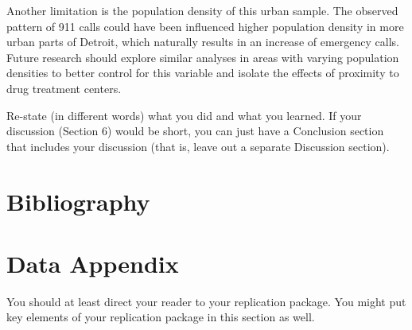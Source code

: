 \documentclass[12pt]{article}
\begin{document}
    Another limitation is the population density of this urban sample. The observed pattern of 911 calls could have been influenced higher population density in more urban parts of Detroit, which naturally results in an increase of emergency calls. Future research should explore similar analyses in areas with varying population densities to better control for this variable and isolate the effects of proximity to drug treatment centers. 

 
Re-state (in different words) what you did and what you learned. If your discussion (Section 6) would be short, you can just have a Conclusion section that includes your discussion (that is, leave out a separate Discussion section).

\newpage
\section*{Bibliography}
\singlespacing
\setlength\bibsep{0pt}





\newpage
\section*{Data Appendix} \label{sec:appendixa}

You should at least direct your reader to your replication package. You might put key elements of your replication package in this section as well.
\end{document}
